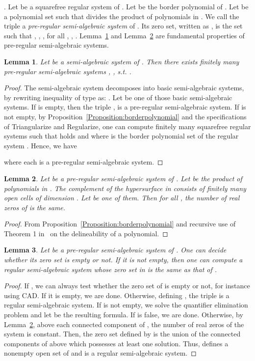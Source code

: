 \documentclass{sig-alternate}
\newtheorem{Lemma}{Lemma}
\begin{document}
\smallskip{}.
Let  be a squarefree regular system  of .
Let  be the border polynomial of .
Let  be a polynomial set such that 
 divides the product of polynomials in .
We call the triple  a 
{\em pre-regular semi-algebraic system} of .
Its zero set, written as , is 
the set  such that , , ,
for all , , .
Lemma~\ref{Lemma:decompose-prsas} and Lemma~\ref{Lemma:prsas}
are fundamental properties of pre-regular semi-algebraic systems.


\begin{Lemma}
\label{Lemma:decompose-prsas}
Let  be a semi-algebraic system of .
Then there exists finitely many pre-regular semi-algebraic systems
, , 
s.t. .
\end{Lemma}
\begin{proof}
The semi-algebraic system  decomposes
into basic semi-algebraic systems,
by rewriting  inequality of type  as: .
Let  be one of those basic semi-algebraic systems.
If  is empty, then the triple , 
is a pre-regular semi-algebraic system.
If  is not empty, by Proposition~\ref{Proposition:borderpolynomial}
and the specifications of {\sf Triangularize} and {\sf Regularize}, 
one can compute finitely many
squarefree regular systems  
such that  holds and 
where  is the border polynomial set of the regular system .
Hence, we have

where each 
 is a pre-regular semi-algebraic system. 
\end{proof}

\begin{Lemma}
\label{Lemma:prsas}
Let  be a pre-regular semi-algebraic system 
of .
Let  be the product of polynomials in .
The complement of the hypersurface  in  consists of 
finitely many open cells 
of dimension .
Let  be one of them.
Then for all , 
the number of real zeros of  is the same.
\end{Lemma}
\begin{proof}
From 
Proposition~\ref{Proposition:borderpolynomial}
and recursive use of Theorem 1 in~\cite{col75}
on the delineability of a polynomial.
\end{proof}

\begin{Lemma}
\label{Lemma:pre2regular}
Let  be a pre-regular semi-algebraic system 
 of .
One can decide whether its zero set is empty or not.
If it is not empty, then one can compute 
a regular semi-algebraic system 
whose zero set in  is the same as that of .
\end{Lemma}
\begin{proof}
If ,
we can always test whether 
the zero set of  is empty or not,
for instance using {\small CAD}.
If it is empty, we are done.
Otherwise, defining , 
the triple  is a regular semi-algebraic system.
If  is not empty, 
we solve the quantifier elimination problem 
 and let
 be the resulting formula.
If  is false, we are done.
Otherwise, by Lemma~\ref{Lemma:prsas},
above each connected component of , 
the number of real zeros of the system 
is constant.
Then, the zero set defined by  is the union
of the connected  components of 
 above which 
possesses at least one solution.
Thus, 
defines a nonempty open set of 
and 
 is a regular semi-algebraic system.
\end{proof}
\end{document}
